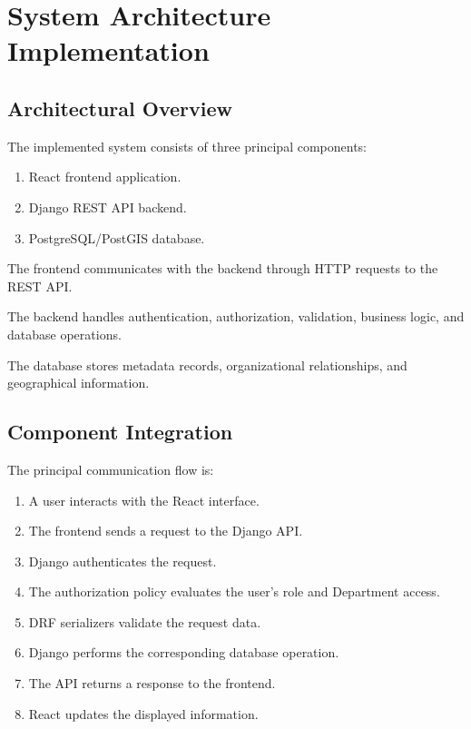 \documentclass[11pt,a4paper]{article}
\begin{document}
\section{System Architecture Implementation}

\subsection{Architectural Overview}

The implemented system consists of three principal
components:

\begin{enumerate}
    \item React frontend application.
    \item Django REST API backend.
    \item PostgreSQL/PostGIS database.
\end{enumerate}

The frontend communicates with the backend through
HTTP requests to the REST API.

The backend handles authentication, authorization,
validation, business logic, and database operations.

The database stores metadata records, organizational
relationships, and geographical information.

\subsection{Component Integration}

The principal communication flow is:

\begin{enumerate}
    \item A user interacts with the React interface.
    \item The frontend sends a request to the Django API.
    \item Django authenticates the request.
    \item The authorization policy evaluates the
    user's role and Department access.
    \item DRF serializers validate the request data.
    \item Django performs the corresponding database operation.
    \item The API returns a response to the frontend.
    \item React updates the displayed information.
\end{enumerate}
\end{document}
